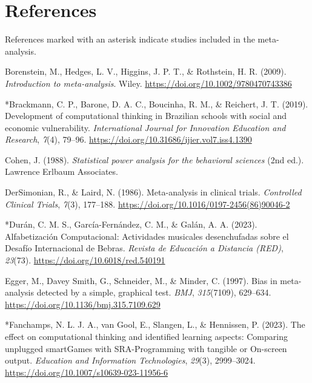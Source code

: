 \documentclass[man,a4paper,12pt,floatsintext,nolmodern,notab]{apa7}
\begin{document}
\section{References}
\noindent References marked with an asterisk indicate studies included in the meta-analysis.\par
\par\noindent\hangindent=0.5in Borenstein, M., Hedges, L. V., Higgins, J. P. T., \& Rothstein, H. R. (2009). \textit{Introduction to meta-analysis}. Wiley. \url{https://doi.org/10.1002/9780470743386}\par
\par\noindent\hangindent=0.5in *Brackmann, C. P., Barone, D. A. C., Boucinha, R. M., \& Reichert, J. T. (2019). Development of computational thinking in Brazilian schools with social and economic vulnerability. \textit{International Journal for Innovation Education and Research}, \textit{7}(4), 79–96. \url{https://doi.org/10.31686/ijier.vol7.iss4.1390}\par
\par\noindent\hangindent=0.5in Cohen, J. (1988). \textit{Statistical power analysis for the behavioral sciences} (2nd ed.). Lawrence Erlbaum Associates.\par
\par\noindent\hangindent=0.5in DerSimonian, R., \& Laird, N. (1986). Meta-analysis in clinical trials. \textit{Controlled Clinical Trials}, \textit{7}(3), 177–188. \url{https://doi.org/10.1016/0197-2456(86)90046-2}\par
\par\noindent\hangindent=0.5in *Durán, C. M. S., García-Fernández, C. M., \& Galán, A. A. (2023). Alfabetización Computacional: Actividades musicales desenchufadas sobre el Desafío Internacional de Bebras. \textit{Revista de Educación a Distancia (RED)}, \textit{23}(73). \url{https://doi.org/10.6018/red.540191}\par
\par\noindent\hangindent=0.5in Egger, M., Davey Smith, G., Schneider, M., \& Minder, C. (1997). Bias in meta-analysis detected by a simple, graphical test. \textit{BMJ}, \textit{315}(7109), 629–634. \url{https://doi.org/10.1136/bmj.315.7109.629}\par
\par\noindent\hangindent=0.5in *Fanchamps, N. L. J. A., van Gool, E., Slangen, L., \& Hennissen, P. (2023). The effect on computational thinking and identified learning aspects: Comparing unplugged smartGames with SRA-Programming with tangible or On-screen output. \textit{Education and Information Technologies}, \textit{29}(3), 2999–3024. \url{https://doi.org/10.1007/s10639-023-11956-6}\par
\end{document}
